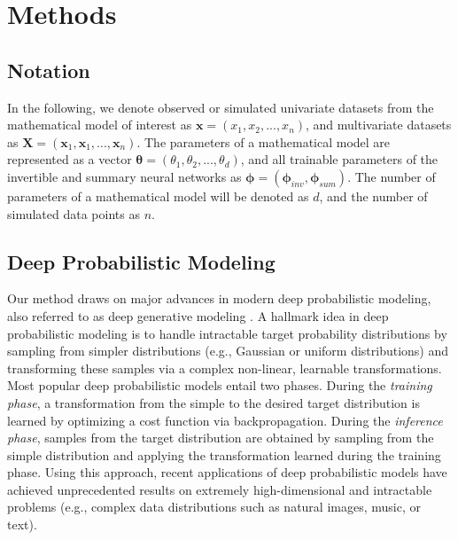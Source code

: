 \documentclass[9pt,twoside,lineno]{pnas-new}
\begin{document}
\section*{Methods}


\subsection*{Notation}

In the following, we denote observed or simulated univariate datasets from the mathematical model of interest as $\boldsymbol{x} = (x_{1}, x_{2},...,x_{n})$, and multivariate datasets as $\boldsymbol{X} = (\boldsymbol{x}_{1}, \boldsymbol{x}_{1},...,\boldsymbol{x}_{n})$. The parameters of a mathematical model are represented as a vector $\boldsymbol{\theta} = (\theta_{1}, \theta_{2},...,\theta_{d})$, and all trainable parameters of the invertible and summary neural networks as $\boldsymbol{\phi} = (\boldsymbol{\phi}_{inv}, \boldsymbol{\phi}_{sum})$. The number of parameters of a mathematical model will be denoted as $d$, and the number of simulated data points as $n$.

\subsection*{Deep Probabilistic Modeling}

Our method draws on major advances in modern deep probabilistic modeling, also referred to as deep generative modeling \cite{bloem2019probabilistic, kingma2018glow, ardizzone2018analyzing, kingma2014auto}. A hallmark idea in deep probabilistic modeling is to handle intractable target probability distributions by sampling from simpler distributions (e.g., Gaussian or uniform distributions) and transforming these samples via a complex non-linear, learnable transformations. Most popular deep probabilistic models entail two phases. During the \textit{training phase}, a transformation from the simple to the desired target distribution is learned by optimizing a cost function via backpropagation. During the \textit{inference phase}, samples from the target distribution are obtained by sampling from the simple distribution and applying the transformation learned during the training phase. Using this approach, recent applications of deep probabilistic models have achieved unprecedented results on extremely high-dimensional and intractable problems (e.g., complex data distributions such as natural images, music, or text).
\end{document}
